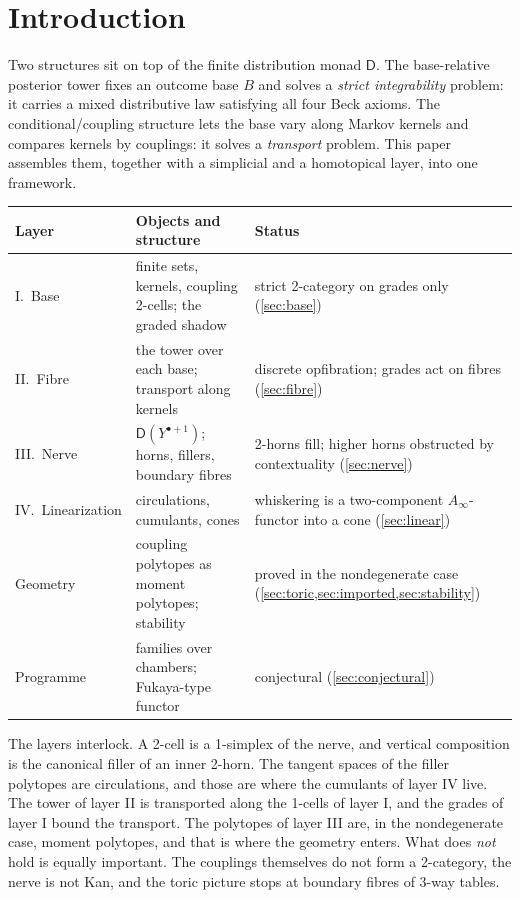 \documentclass[11pt]{article}
\theoremstyle{definition}
\theoremstyle{remark}
\newcommand{\D}{\mathsf{D}}
\begin{document}
\tableofcontents

\section{Introduction}\label{sec:intro}

Two structures sit on top of the finite distribution monad $\D$. The base-relative posterior tower
\cite{Awasthi-Tower} fixes an outcome base $B$ and solves a \emph{strict integrability} problem: it carries a
mixed distributive law satisfying all four Beck axioms. The conditional/coupling structure
\cite{Awasthi-Attribution} lets the base vary along Markov kernels and compares kernels by couplings: it solves
a \emph{transport} problem. This paper assembles them, together with a simplicial and a homotopical layer,
into one framework.

\begin{center}\small
\begin{tabular}{@{}R{0.17\textwidth}R{0.42\textwidth}R{0.33\textwidth}@{}}
\toprule
Layer & Objects and structure & Status\\
\midrule
I.\ Base & finite sets, kernels, coupling 2-cells; the graded shadow & strict 2-category on grades only
(\cref{sec:base})\\
II.\ Fibre & the tower over each base; transport along kernels & discrete opfibration; grades act on fibres
(\cref{sec:fibre})\\
III.\ Nerve & $\D(Y^{\bullet+1})$; horns, fillers, boundary fibres & 2-horns fill; higher horns obstructed by
contextuality (\cref{sec:nerve})\\
IV.\ Linearization & circulations, cumulants, cones & whiskering is a two-component $A_\infty$-functor into a cone
(\cref{sec:linear})\\
Geometry & coupling polytopes as moment polytopes; stability & proved in the nondegenerate case
(\cref{sec:toric,sec:imported,sec:stability})\\
Programme & families over chambers; Fukaya-type functor & conjectural (\cref{sec:conjectural})\\
\bottomrule
\end{tabular}
\end{center}

The layers interlock. A 2-cell is a 1-simplex of the nerve, and vertical composition is the canonical filler of
an inner 2-horn. The tangent spaces of the filler polytopes are circulations, and those are where the cumulants
of layer IV live. The tower of layer II is transported along the 1-cells of layer I, and the grades of layer I
bound the transport. The polytopes of layer III are, in the nondegenerate case, moment polytopes, and that is
where the geometry enters. What does \emph{not} hold is equally important. The couplings themselves do not form a
2-category, the nerve is not Kan, and the toric picture stops at boundary fibres of 3-way tables.
\end{document}
